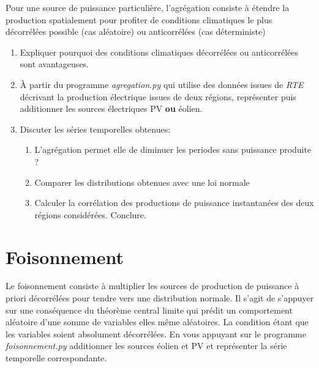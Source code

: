 \documentclass[12pt,a4,french]{article}
\newcommand{\tmtextit}[1]{{\itshape{#1}}}
\begin{document}
Pour une source de puissance particulière, l'agrégation consiste à étendre la production spatialement pour profiter de conditions climatiques le plus décorrélées possible (cas aléatoire) ou anticorrélées (cas déterministe)
\begin{enumerate}
	\item Expliquer pourquoi des conditions climatiques décorrélées ou anticorrélées sont avantageuses.
  	\item À partir du programme \tmtextit{agregation.py} qui utilise des
  données issues de \tmtextit{RTE} décrivant la production électrique
  issues de deux régions, représenter puis additionner les sources
  électriques PV \textbf{ou} éolien.
	\item Discuter les séries temporelles obtenues:
  \begin{enumerate}
    \item L'agrégation permet elle de
    diminuer les periodes sans puissance produite ?
    \item Comparer les distributions obtenues avec une loi normale
    \item Calculer la corrélation des productions de puissance instantanées des deux régions considérées. Conclure.
  \end{enumerate}
\end{enumerate}

\section{Foisonnement}

Le foisonnement consiste à multiplier les sources de production de puissance
à priori décorrélées pour tendre vers une distribution normale. Il s'agit de s'appuyer sur une conséquence du théorème central limite qui prédit un
comportement aléatoire d'une somme de variables elles même aléatoires. La
condition étant que les variables soient absolument décorrélées. En vous
appuyant sur le programme \tmtextit{foisonnement.py} additionner les sources
éolien et PV et représenter la série temporelle correspondante.
\end{document}
